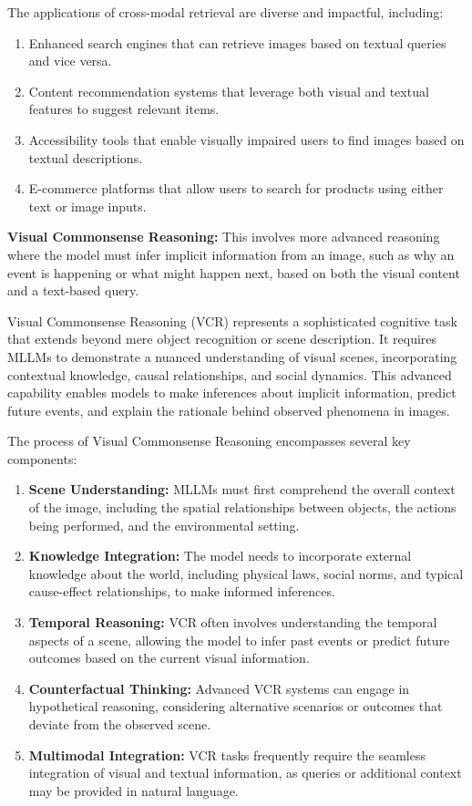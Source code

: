 The applications of cross-modal retrieval are diverse and impactful, including:

\begin{enumerate}
    \item Enhanced search engines that can retrieve images based on textual queries and vice versa.
    \item Content recommendation systems that leverage both visual and textual features to suggest relevant items.
    \item Accessibility tools that enable visually impaired users to find images based on textual descriptions.
    \item E-commerce platforms that allow users to search for products using either text or image inputs.
\end{enumerate}

\textbf{Visual Commonsense Reasoning:} This involves more advanced reasoning where the model must infer implicit information from an image, such as why an event is happening or what might happen next, based on both the visual content and a text-based query.

Visual Commonsense Reasoning (VCR) represents a sophisticated cognitive task that extends beyond mere object recognition or scene description. It requires MLLMs to demonstrate a nuanced understanding of visual scenes, incorporating contextual knowledge, causal relationships, and social dynamics. This advanced capability enables models to make inferences about implicit information, predict future events, and explain the rationale behind observed phenomena in images.

The process of Visual Commonsense Reasoning encompasses several key components:

\begin{enumerate}
    \item \textbf{Scene Understanding:} MLLMs must first comprehend the overall context of the image, including the spatial relationships between objects, the actions being performed, and the environmental setting.
    \item \textbf{Knowledge Integration:} The model needs to incorporate external knowledge about the world, including physical laws, social norms, and typical cause-effect relationships, to make informed inferences.
    \item \textbf{Temporal Reasoning:} VCR often involves understanding the temporal aspects of a scene, allowing the model to infer past events or predict future outcomes based on the current visual information.
    \item \textbf{Counterfactual Thinking:} Advanced VCR systems can engage in hypothetical reasoning, considering alternative scenarios or outcomes that deviate from the observed scene.
    \item \textbf{Multimodal Integration:} VCR tasks frequently require the seamless integration of visual and textual information, as queries or additional context may be provided in natural language.
\end{enumerate}

